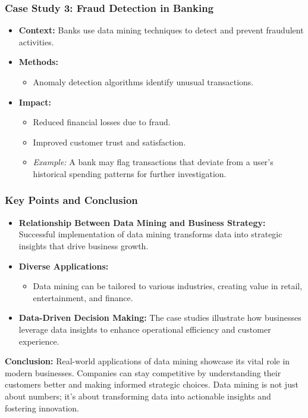\documentclass[aspectratio=169]{beamer}
\begin{document}
\begin{frame}[fragile]
    \frametitle{Case Study 3: Fraud Detection in Banking}
    \begin{itemize}
        \item \textbf{Context:} Banks use data mining techniques to detect and prevent fraudulent activities.
        \item \textbf{Methods:} 
            \begin{itemize}
                \item Anomaly detection algorithms identify unusual transactions.
            \end{itemize}
        \item \textbf{Impact:}
            \begin{itemize}
                \item Reduced financial losses due to fraud.
                \item Improved customer trust and satisfaction.
                \item \textit{Example:} A bank may flag transactions that deviate from a user's historical spending patterns for further investigation.
            \end{itemize}
    \end{itemize}
\end{frame}

\begin{frame}[fragile]
    \frametitle{Key Points and Conclusion}
    \begin{itemize}
        \item \textbf{Relationship Between Data Mining and Business Strategy:} Successful implementation of data mining transforms data into strategic insights that drive business growth.
        \item \textbf{Diverse Applications:} 
            \begin{itemize}
                \item Data mining can be tailored to various industries, creating value in retail, entertainment, and finance.
            \end{itemize}
        \item \textbf{Data-Driven Decision Making:} The case studies illustrate how businesses leverage data insights to enhance operational efficiency and customer experience.
    \end{itemize}
    
    \textbf{Conclusion:} Real-world applications of data mining showcase its vital role in modern businesses. Companies can stay competitive by understanding their customers better and making informed strategic choices. Data mining is not just about numbers; it’s about transforming data into actionable insights and fostering innovation.
\end{frame}
\end{document}
